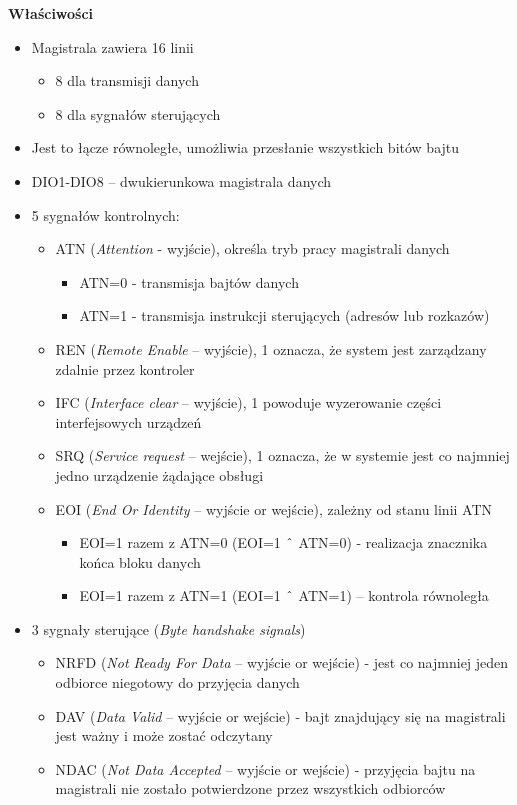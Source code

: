 \textbf{Właściwości}
\begin{itemize}
	\item Magistrala zawiera 16 linii
	\begin{itemize}
		\item 8 dla transmisji danych
		\item 8 dla sygnałów sterujących
	\end{itemize}
	\item Jest to łącze równoległe, umożliwia przesłanie wszystkich bitów bajtu
	\item DIO1-DIO8 – dwukierunkowa magistrala danych
	\item 5 sygnałów kontrolnych:
	\begin{itemize}
		\item ATN (\emph{Attention} - wyjście), określa tryb pracy magistrali danych
		\begin{itemize}
			\item ATN=0 - transmisja bajtów danych
			\item ATN=1 - transmisja instrukcji sterujących (adresów lub rozkazów)
		\end{itemize}
		\item REN (\emph{Remote Enable} – wyjście), 1 oznacza, że system jest zarządzany zdalnie przez kontroler
		\item IFC (\emph{Interface clear} – wyjście), 1 powoduje wyzerowanie części interfejsowych urządzeń
		\item SRQ (\emph{Service request} – wejście), 1 oznacza, że w systemie jest co najmniej jedno urządzenie żądające obsługi
		\item EOI (\emph{End Or Identity} – wyjście or wejście), zależny od stanu linii ATN
		\begin{itemize}
			\item EOI=1 razem z ATN=0 (EOI=1 $\XOR$ ATN=0) - realizacja znacznika końca bloku danych
			\item EOI=1 razem z ATN=1 (EOI=1 $\XOR$ ATN=1) – kontrola równoległa
		\end{itemize}
	\end{itemize}
	\item 3 sygnały sterujące (\emph{Byte handshake signals})
	\begin{itemize}
		\item NRFD (\emph{Not Ready For Data} – wyjście or wejście) - jest co najmniej jeden odbiorce niegotowy do przyjęcia danych
		\item DAV (\emph{Data Valid} – wyjście or wejście) - bajt znajdujący się na magistrali jest ważny i może zostać odczytany
		\item NDAC (\emph{Not Data Accepted} – wyjście or wejście) - przyjęcia bajtu na magistrali nie zostało potwierdzone przez wszystkich odbiorców
	\end{itemize}
\end{itemize}

